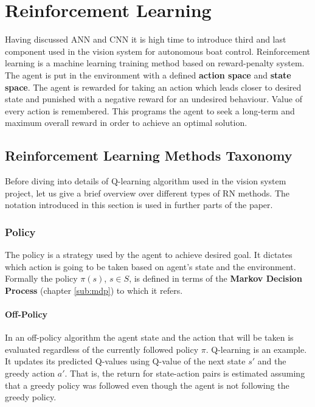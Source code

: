 \chapter{Reinforcement Learning}
\label{cha:reinforcement-learning}

Having discussed ANN and CNN it is high time to introduce third and last component used in the vision system for autonomous boat control. Reinforcement learning is a machine learning training method based on reward-penalty system. The agent is put in the environment with a defined \textbf{action space} and \textbf{state space}. The agent is rewarded for taking an action which leads closer to desired state and punished with a negative reward for an undesired behaviour. Value of every action is remembered. This programs the agent to seek a long-term and maximum overall reward in order to achieve an optimal solution.

\section{Reinforcement Learning Methods Taxonomy}
\label{sec:classification-of-reinforcement-learning-methods}

Before diving into details of Q-learning algorithm used in the vision system project, let us give a brief overview over different types of RN methods. The notation introduced in this section is used in further parts of the paper.

\subsection{Policy}
\label{sub:policy}

The policy is a strategy used by the agent to achieve desired goal. It dictates which action is going to be taken based on agent's state and the environment. Formally the policy $\pi(s)$, $s\in{S}$, is defined in terms of the \textbf{Markov Decision Process} (chapter \ref{sub:mdp}) to which it refers. 

\subsubsection*{Off-Policy}
\label{sub2:off-poicy}

In an off-policy algorithm the agent state and the action that will be taken is evaluated regardless of the currently followed policy $\pi$. Q-learning is an example. It updates its predicted Q-values using Q-value of the next state $s'$ and the greedy action $a'$. That is, the return for state-action pairs is estimated assuming that a greedy policy was followed even though the agent is not following the greedy policy.


